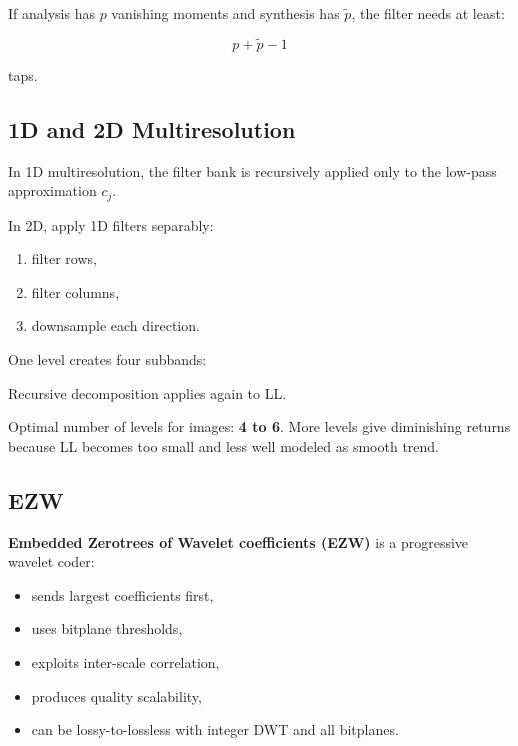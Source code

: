If analysis has $p$ vanishing moments and synthesis has $\tilde{p}$, the filter needs at least:

\[
p+\tilde{p}-1
\]

taps.

\subsection{1D and 2D Multiresolution}

In 1D multiresolution, the filter bank is recursively applied only to the low-pass approximation $c_j$.

In 2D, apply 1D filters separably:

\begin{enumerate}
  \item filter rows,
  \item filter columns,
  \item downsample each direction.
\end{enumerate}

One level creates four subbands:

\begin{center}
\end{center}

Recursive decomposition applies again to LL.

Optimal number of levels for images: \textbf{4 to 6}. More levels give diminishing returns because LL becomes too small and less well modeled as smooth trend.

\subsection{EZW}

\textbf{Embedded Zerotrees of Wavelet coefficients (EZW)} is a progressive wavelet coder:

\begin{itemize}
  \item sends largest coefficients first,
  \item uses bitplane thresholds,
  \item exploits inter-scale correlation,
  \item produces quality scalability,
  \item can be lossy-to-lossless with integer DWT and all bitplanes.
\end{itemize}

